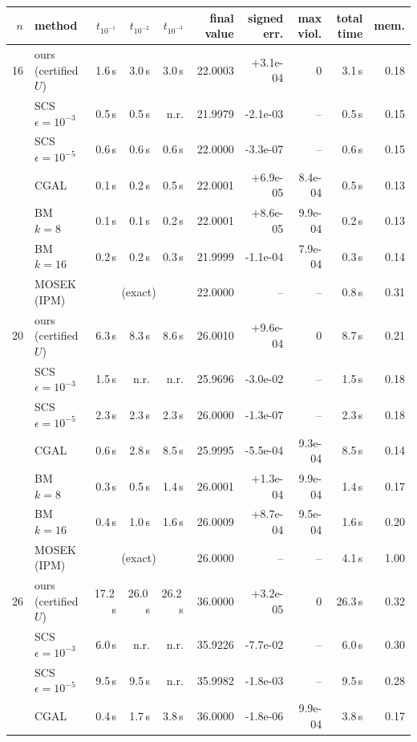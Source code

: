 \begin{tabular}{r l r r r r r r r r}\toprule
$n$ & method & $t_{10^{-1}}$ & $t_{10^{-2}}$ & $t_{10^{-3}}$ & final value & signed err. & max viol. & total time & mem. \\\midrule
16 & ours (certified $U$) & 1.6\,s & 3.0\,s & 3.0\,s & 22.0003 & +3.1e-04 & $0$ & 3.1\,s & 0.18 \\
 & SCS $\epsilon{=}10^{-3}$ & 0.5\,s & 0.5\,s & n.r. & 21.9979 & -2.1e-03 & -- & 0.5\,s & 0.15 \\
 & SCS $\epsilon{=}10^{-5}$ & 0.6\,s & 0.6\,s & 0.6\,s & 22.0000 & -3.3e-07 & -- & 0.6\,s & 0.15 \\
 & CGAL & 0.1\,s & 0.2\,s & 0.5\,s & 22.0001 & +6.9e-05 & 8.4e-04 & 0.5\,s & 0.13 \\
 & BM $k{=}8$ & 0.1\,s & 0.1\,s & 0.2\,s & 22.0001 & +8.6e-05 & 9.9e-04 & 0.2\,s & 0.13 \\
 & BM $k{=}16$ & 0.2\,s & 0.2\,s & 0.3\,s & 21.9999 & -1.1e-04 & 7.9e-04 & 0.3\,s & 0.14 \\
 & MOSEK (IPM) & \multicolumn{3}{c}{(exact)} & 22.0000 & -- & -- & 0.8\,s & 0.31 \\
\midrule
20 & ours (certified $U$) & 6.3\,s & 8.3\,s & 8.6\,s & 26.0010 & +9.6e-04 & $0$ & 8.7\,s & 0.21 \\
 & SCS $\epsilon{=}10^{-3}$ & 1.5\,s & n.r. & n.r. & 25.9696 & -3.0e-02 & -- & 1.5\,s & 0.18 \\
 & SCS $\epsilon{=}10^{-5}$ & 2.3\,s & 2.3\,s & 2.3\,s & 26.0000 & -1.3e-07 & -- & 2.3\,s & 0.18 \\
 & CGAL & 0.6\,s & 2.8\,s & 8.5\,s & 25.9995 & -5.5e-04 & 9.3e-04 & 8.5\,s & 0.14 \\
 & BM $k{=}8$ & 0.3\,s & 0.5\,s & 1.4\,s & 26.0001 & +1.3e-04 & 9.9e-04 & 1.4\,s & 0.17 \\
 & BM $k{=}16$ & 0.4\,s & 1.0\,s & 1.6\,s & 26.0009 & +8.7e-04 & 9.5e-04 & 1.6\,s & 0.20 \\
 & MOSEK (IPM) & \multicolumn{3}{c}{(exact)} & 26.0000 & -- & -- & 4.1\,s & 1.00 \\
\midrule
26 & ours (certified $U$) & 17.2\,s & 26.0\,s & 26.2\,s & 36.0000 & +3.2e-05 & $0$ & 26.3\,s & 0.32 \\
 & SCS $\epsilon{=}10^{-3}$ & 6.0\,s & n.r. & n.r. & 35.9226 & -7.7e-02 & -- & 6.0\,s & 0.30 \\
 & SCS $\epsilon{=}10^{-5}$ & 9.5\,s & 9.5\,s & n.r. & 35.9982 & -1.8e-03 & -- & 9.5\,s & 0.28 \\
 & CGAL & 0.4\,s & 1.7\,s & 3.8\,s & 36.0000 & -1.8e-06 & 9.9e-04 & 3.8\,s & 0.17 \\

\end{tabular}
